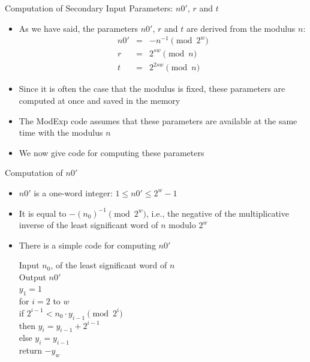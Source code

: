 \documentclass[xcolor=dvipsnames]{beamer}
\begin{document}
\begin{frame}{Computation of Secondary Input Parameters: $n0'$, $r$ and $t$}
\begin{itemize}

\item As we have said, the parameters $n0'$, $r$ and $t$ are derived from 
the modulus $n$:
\begin{eqnarray*}
n0' & = & -n^{-1} \pmod{2^w} \\
r   & = & 2^{sw} \pmod{n} \\
t   & = & 2^{2sw} \pmod{n}
\end{eqnarray*}

\item Since it is often the case that the modulus is fixed, these parameters
are computed at once and saved in the memory
\item The ModExp code assumes that these parameters are available at the
same time with the modulus $n$
\item We now give code for computing these parameters 

\end{itemize}
\end{frame}

\begin{frame}{Computation of $n0'$}
\begin{itemize}

\item $n0'$ is a one-word integer: $1 \leq n0' \leq 2^w-1$
\item It is equal to $-(n_0)^{-1} \pmod{2^w}$, i.e.,
the negative of the multiplicative inverse of the 
least significant word of $n$ modulo $2^w$
\item There is a simple code for computing $n0'$

\hspace*{2em} Input $n_0$, of the least significant word of $n$ \\
\hspace*{2em} Output $n0'$ \\
\hspace*{2em} $y_1=1$ \\
\hspace*{2em} for $i=2$ to $w$ \\
\hspace*{2em} \hspace*{2em} if $2^{i-1} < n_0 \cdot y_{i-1} \pmod{2^i}$ \\
\hspace*{2em} \hspace*{4em} then $y_i=y_{i-1}+2^{i-1}$ \\
\hspace*{2em} \hspace*{4em} else $y_i = y_{i-1}$ \\
\hspace*{2em} return $-y_w$

\end{itemize}
\end{frame}
\end{document}
